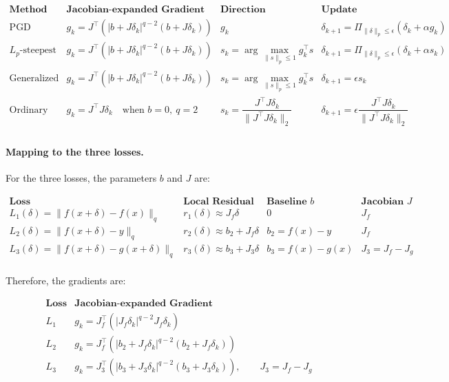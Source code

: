 \documentclass{article}
\begin{document}
\[
\begin{array}{c|c|c|c}
\textbf{Method}
&
\textbf{Jacobian-expanded Gradient}
&
\textbf{Direction}
&
\textbf{Update}
\\
\hline
\text{PGD}
&
g_k=
J^\top
\left(
|b+J\delta_k|^{q-2}
(b+J\delta_k)
\right)
&
g_k
&
\delta_{k+1}
=
\Pi_{\|\delta\|_p\le\epsilon}
\left(
\delta_k+\alpha g_k
\right)
\\
\hline
L_p\text{-steepest PGD}
&
g_k=
J^\top
\left(
|b+J\delta_k|^{q-2}
(b+J\delta_k)
\right)
&
s_k=
\arg\max_{\|s\|_p\le1}
g_k^\top s
&
\delta_{k+1}
=
\Pi_{\|\delta\|_p\le\epsilon}
\left(
\delta_k+\alpha s_k
\right)
\\
\hline
\text{Generalized Power Iteration}
&
g_k=
J^\top
\left(
|b+J\delta_k|^{q-2}
(b+J\delta_k)
\right)
&
s_k=
\arg\max_{\|s\|_p\le1}
g_k^\top s
&
\delta_{k+1}
=
\epsilon s_k
\\
\hline
\text{Ordinary Power Iteration}
&
g_k=J^\top J\delta_k
\quad
\text{when } b=0,\ q=2
&
s_k=\dfrac{J^\top J\delta_k}{\|J^\top J\delta_k\|_2}
&
\delta_{k+1}
=
\epsilon
\dfrac{J^\top J\delta_k}
{\|J^\top J\delta_k\|_2}
\\
\end{array}
\]

\paragraph{Mapping to the three losses.}
For the three losses, the parameters $b$ and $J$ are:

\[
\begin{array}{c|c|c|c}
\textbf{Loss}
&
\textbf{Local Residual}
&
\textbf{Baseline } b
&
\textbf{Jacobian } J
\\
\hline
L_1(\delta)=\|f(x+\delta)-f(x)\|_q
&
r_1(\delta)\approx J_f\delta
&
0
&
J_f
\\
\hline
L_2(\delta)=\|f(x+\delta)-y\|_q
&
r_2(\delta)\approx b_2+J_f\delta
&
b_2=f(x)-y
&
J_f
\\
\hline
L_3(\delta)=\|f(x+\delta)-g(x+\delta)\|_q
&
r_3(\delta)\approx b_3+J_3\delta
&
b_3=f(x)-g(x)
&
J_3=J_f-J_g
\\
\end{array}
\]

Therefore, the gradients are:

\[
\begin{array}{c|c}
\textbf{Loss}
&
\textbf{Jacobian-expanded Gradient}
\\
\hline
L_1
&
g_k
=
J_f^\top
\left(
|J_f\delta_k|^{q-2}
J_f\delta_k
\right)
\\
\hline
L_2
&
g_k
=
J_f^\top
\left(
|b_2+J_f\delta_k|^{q-2}
(b_2+J_f\delta_k)
\right)
\\
\hline
L_3
&
g_k
=
J_3^\top
\left(
|b_3+J_3\delta_k|^{q-2}
(b_3+J_3\delta_k)
\right),
\qquad
J_3=J_f-J_g
\\
\end{array}
\]
\end{document}
